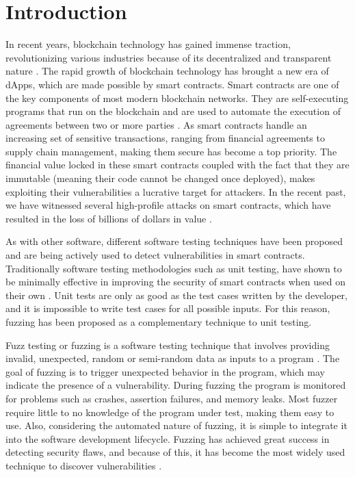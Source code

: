 
\chapter{Introduction}\label{chapter:introduction}
In recent years, blockchain technology has gained immense traction, revolutionizing various industries because of its decentralized and transparent nature \cite{noauthor_global_nodate}.
The rapid growth of blockchain technology has brought a new era of \acp{dApp}, which are made possible by smart contracts.
Smart contracts are one of the key components of most modern blockchain networks.
They are self-executing programs that run on the blockchain and are used to automate the execution of agreements between two or more parties \cite{zou_smart_2021}.
As smart contracts handle an increasing set of sensitive transactions, ranging from financial agreements to supply chain management, making them secure has become a top priority.
The financial value locked in these smart contracts coupled with the fact that they are immutable (meaning their code cannot be changed once deployed), makes exploiting their vulnerabilities a lucrative target for attackers.
In the recent past, we have witnessed several high-profile attacks on smart contracts, which have resulted in the loss of billions of dollars in value  \cite{noauthor_funds_nodate}.

As with other software, different software testing techniques have been proposed and are being actively used to detect vulnerabilities in smart contracts.
Traditionally software testing methodologies such as unit testing, have shown to be minimally effective in improving the security of smart contracts when used on their own \cite{noauthor_smart_nodate}.
Unit tests are only as good as the test cases written by the developer, and it is impossible to write test cases for all possible inputs.
For this reason, fuzzing has been proposed as a complementary technique to unit testing.

Fuzz testing or fuzzing is a software testing technique that involves providing invalid, unexpected, random or semi-random data as inputs to a program \cite{manes_art_2019}.
The goal of fuzzing is to trigger unexpected behavior in the program, which may indicate the presence of a vulnerability.
During fuzzing the program is monitored for problems such as crashes, assertion failures, and memory leaks.
Most fuzzer require little to no knowledge of the program under test, making them easy to use.
Also, considering the automated nature of fuzzing, it is simple to integrate it into the software development lifecycle.
Fuzzing has achieved great success in detecting security flaws, and because of this, it has become the most widely used technique to discover vulnerabilities \cite{li_fuzzing_2018, zhu_fuzzing_2022}.

